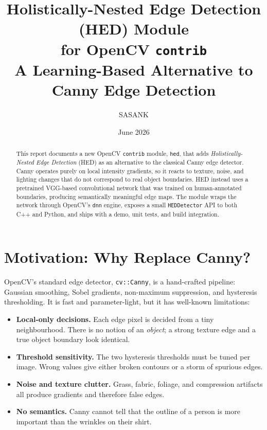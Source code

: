 \documentclass[11pt]{article}
\title{\textbf{Holistically-Nested Edge Detection (HED) Module \\ for OpenCV \texttt{contrib}}\\[0.4em]
\large A Learning-Based Alternative to Canny Edge Detection}
\author{SASANK}
\date{June 2026}
\begin{document}
\maketitle

\begin{abstract}
This report documents a new OpenCV \texttt{contrib} module, \texttt{hed}, that adds
\emph{Holistically-Nested Edge Detection} (HED) as an alternative to the classical
Canny edge detector. Canny operates purely on local intensity gradients, so it
reacts to texture, noise, and lighting changes that do not correspond to real
object boundaries. HED instead uses a pretrained VGG-based convolutional network
that was trained on human-annotated boundaries, producing semantically meaningful
edge maps. The module wraps the network through OpenCV's \texttt{dnn} engine,
exposes a small \texttt{HEDDetector} API to both C++ and Python, and ships with a
demo, unit tests, and build integration.
\end{abstract}

\tableofcontents
\bigskip

\section{Motivation: Why Replace Canny?}

OpenCV's standard edge detector, \texttt{cv::Canny}, is a hand-crafted pipeline:
Gaussian smoothing, Sobel gradients, non-maximum suppression, and hysteresis
thresholding. It is fast and parameter-light, but it has well-known limitations:

\begin{itemize}[noitemsep]
    \item \textbf{Local-only decisions.} Each edge pixel is decided from a tiny
    neighbourhood. There is no notion of an \emph{object}; a strong texture edge
    and a true object boundary look identical.
    \item \textbf{Threshold sensitivity.} The two hysteresis thresholds must be
    tuned per image. Wrong values give either broken contours or a storm of
    spurious edges.
    \item \textbf{Noise and texture clutter.} Grass, fabric, foliage, and
    compression artifacts all produce gradients and therefore false edges.
    \item \textbf{No semantics.} Canny cannot tell that the outline of a person is
    more important than the wrinkles on their shirt.
\end{itemize}
\end{document}
